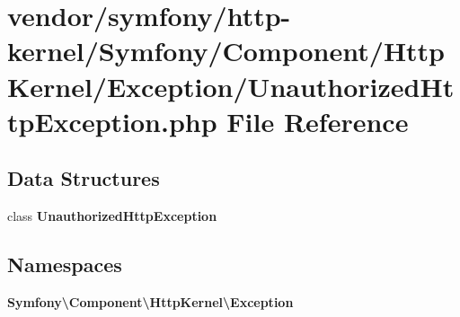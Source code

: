 \section{vendor/symfony/http-\/kernel/\+Symfony/\+Component/\+Http\+Kernel/\+Exception/\+Unauthorized\+Http\+Exception.php File Reference}
\label{_unauthorized_http_exception_8php}
\subsection*{Data Structures}
\begin{DoxyCompactItemize}
\item 
class {\bf Unauthorized\+Http\+Exception}
\end{DoxyCompactItemize}
\subsection*{Namespaces}
\begin{DoxyCompactItemize}
\item 
 {\bf Symfony\textbackslash{}\+Component\textbackslash{}\+Http\+Kernel\textbackslash{}\+Exception}
\end{DoxyCompactItemize}
